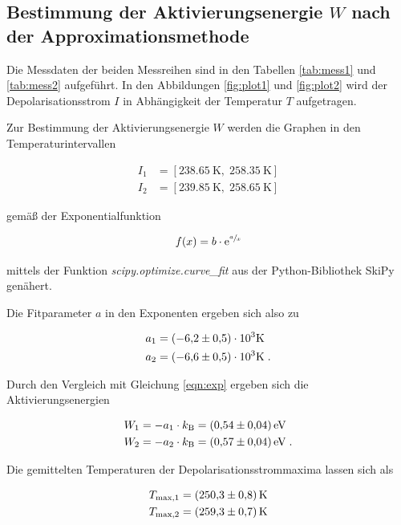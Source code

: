 \subsection{Bestimmung der Aktivierungsenergie $W$ nach der Approximationsmethode}

Die Messdaten der beiden Messreihen sind in den Tabellen \ref{tab:mess1} und \ref{tab:mess2} aufgeführt.
In den Abbildungen \ref{fig:plot1} und \ref{fig:plot2} wird der Depolarisationsstrom $I$ in Abhängigkeit der Temperatur $T$
aufgetragen.

Zur Bestimmung der Aktivierungsenergie $W$ werden die Graphen in den Temperaturintervallen

\begin{align*}
  I_1 &= [\SI{238.65}{\kelvin}, \; \SI{258.35}{\kelvin}] \\
  I_2 &= [\SI{239.85}{\kelvin}, \; \SI{258.65}{\kelvin}]
\end{align*}

gemäß der Exponentialfunktion 

\begin{equation}
  \label{eqn:fit}
  f(x) = b \cdot \text{e}^{\sfrac{a}{x}}
\end{equation}

mittels der Funktion \textit{scipy.optimize.curve\_fit} aus der Python-Bibliothek SkiPy genähert.

Die Fitparameter $a$ in den Exponenten ergeben sich also zu

\begin{align*}
  a_1 &= (\num{-6.2 +- 0.5})\cdot 10^3 \si{\kelvin} \\
  a_2 &= (\num{-6.6 +- 0.5})\cdot 10^3 \si{\kelvin} \; .
\end{align*}

Durch den Vergleich mit Gleichung \eqref{eqn:exp} ergeben sich die Aktivierungsenergien

\begin{align*}
  W_1 &= -a_1 \cdot k_\text{B} = \SI{0.54 +- 0.04}{\eV} \\
  W_2 &= -a_2 \cdot k_\text{B} = \SI{0.57 +- 0.04}{\eV}  \; .
\end{align*}

Die gemittelten Temperaturen der Depolarisationsstrommaxima lassen sich als

\begin{align*}
  T_\text{max,1} &= \SI{250.3 +- 0.8}{\kelvin} \\
  T_\text{max,2} &= \SI{259.3 +- 0.7}{\kelvin}
\end{align*}

